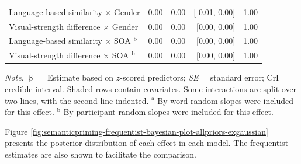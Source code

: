 \documentclass[
  12pt,
  man,floatsintext]{apa7}
\begin{document}
\begin{table}[!h]
\begin{threeparttable}
\begin{tabular}[t]{lrrrr}
\hspace{1em}Language-based similarity  $\times$  Gender & 0.00 & 0.00 & {}[-0.01, 0.00] & 1.00\\
\hspace{1em}Visual-strength difference  $\times$  Gender & 0.00 & 0.00 & {}[0.00, 0.00] & 1.00\\
\hspace{1em}Language-based similarity  $\times$  SOA $^{\text{b}}$ & 0.00 & 0.00 & {}[0.00, 0.00] & 1.00\\
\hspace{1em}Visual-strength difference  $\times$  SOA $^{\text{b}}$ & 0.00 & 0.00 & {}[0.00, 0.00] & 1.00\\
\bottomrule
\end{tabular}
\begin{tablenotes}
\item \textit{\linebreak} 
\item \textit{Note}. $\upbeta$ = Estimate based on $z$-scored predictors; \textit{SE} = standard error; \linebreak \phantom{.}CrI = credible interval. Shaded rows contain covariates. Some interactions \linebreak \phantom{.}are split over two lines, with the second line indented. \linebreak \linebreak \phantom{.}$^{\text{a}}$ By-word random slopes were included for this effect. \linebreak \phantom{.}$^{\text{b}}$ By-participant random slopes were included for this effect.
\end{tablenotes}
\end{threeparttable}
\end{table}

\clearpage

Figure \ref{fig:semanticpriming-frequentist-bayesian-plot-allpriors-exgaussian} presents the posterior distribution of each effect in each model. The frequentist estimates are also shown to facilitate the comparison.
\end{document}
